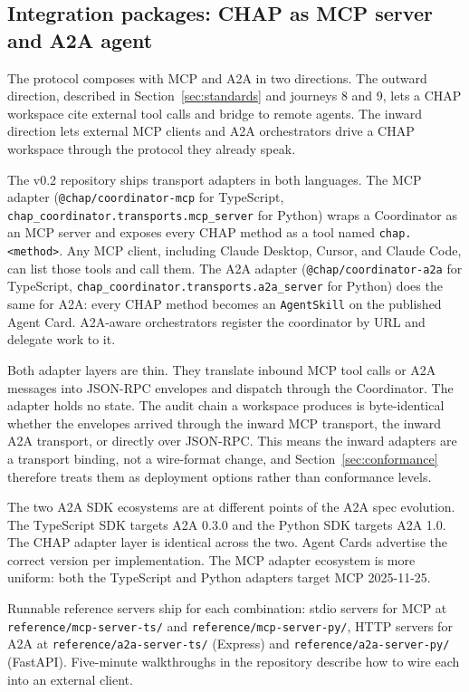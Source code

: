 \documentclass[11pt]{article}
\begin{document}
\subsection{Integration packages: CHAP as MCP server and A2A agent}
\label{sec:integration-packages}

The protocol composes with MCP and A2A in two directions. The outward direction, described in Section~\ref{sec:standards} and journeys 8 and 9, lets a CHAP workspace cite external tool calls and bridge to remote agents. The inward direction lets external MCP clients and A2A orchestrators drive a CHAP workspace through the protocol they already speak.

The v0.2 repository ships transport adapters in both languages. The MCP adapter (\texttt{@chap/coordinator-mcp} for TypeScript, \texttt{chap\_coordinator.transports.mcp\_server} for Python) wraps a Coordinator as an MCP server and exposes every CHAP method as a tool named \texttt{chap.<method>}. Any MCP client, including Claude Desktop, Cursor, and Claude Code, can list those tools and call them. The A2A adapter (\texttt{@chap/coordinator-a2a} for TypeScript, \texttt{chap\_coordinator.transports.a2a\_server} for Python) does the same for A2A: every CHAP method becomes an \texttt{AgentSkill} on the published Agent Card. A2A-aware orchestrators register the coordinator by URL and delegate work to it.

Both adapter layers are thin. They translate inbound MCP tool calls or A2A messages into JSON-RPC envelopes and dispatch through the Coordinator. The adapter holds no state. The audit chain a workspace produces is byte-identical whether the envelopes arrived through the inward MCP transport, the inward A2A transport, or directly over JSON-RPC. This means the inward adapters are a transport binding, not a wire-format change, and Section~\ref{sec:conformance} therefore treats them as deployment options rather than conformance levels.

The two A2A SDK ecosystems are at different points of the A2A spec evolution. The TypeScript SDK targets A2A 0.3.0 and the Python SDK targets A2A 1.0. The CHAP adapter layer is identical across the two. Agent Cards advertise the correct version per implementation. The MCP adapter ecosystem is more uniform: both the TypeScript and Python adapters target MCP 2025-11-25.

Runnable reference servers ship for each combination: stdio servers for MCP at \texttt{reference/mcp-server-ts/} and \texttt{reference/mcp-server-py/}, HTTP servers for A2A at \texttt{reference/a2a-server-ts/} (Express) and \texttt{reference/a2a-server-py/} (FastAPI). Five-minute walkthroughs in the repository describe how to wire each into an external client.
\end{document}
